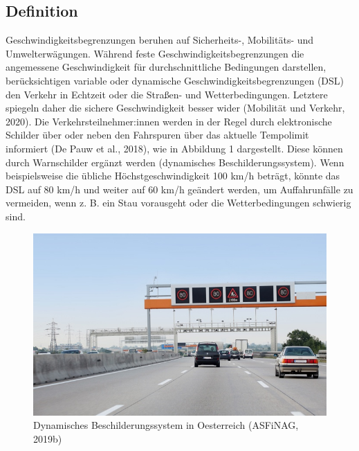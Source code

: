 \documentclass[
]{book}
\begin{document}
\hypertarget{definition-14}{%
\subsection*{Definition}\label{definition-14}}

Geschwindigkeitsbegrenzungen beruhen auf Sicherheits-, Mobilitäts- und Umwelterwägungen. Während feste Geschwindigkeitsbegrenzungen die angemessene Geschwindigkeit für durchschnittliche Bedingungen darstellen, berücksichtigen variable oder dynamische Geschwindigkeitsbegrenzungen (DSL) den Verkehr in Echtzeit oder die Straßen- und Wetterbedingungen. Letztere spiegeln daher die sichere Geschwindigkeit besser wider (Mobilität und Verkehr, 2020). Die Verkehrsteilnehmer:innen werden in der Regel durch elektronische Schilder über oder neben den Fahrspuren über das aktuelle Tempolimit informiert (De Pauw et al., 2018), wie in Abbildung 1 dargestellt. Diese können durch Warnschilder ergänzt werden (dynamisches Beschilderungssystem). Wenn beispielsweise die übliche Höchstgeschwindigkeit 100 km/h beträgt, könnte das DSL auf 80 km/h und weiter auf 60 km/h geändert werden, um Auffahrunfälle zu vermeiden, wenn z. B. ein Stau vorausgeht oder die Wetterbedingungen schwierig sind.

\begin{figure}
\includegraphics[width=0.9\linewidth]{image/dynamic_signage} \caption{Dynamisches Beschilderungssystem in Oesterreich (ASFiNAG, 2019b)}\label{fig:unnamed-chunk-18}
\end{figure}
\end{document}
